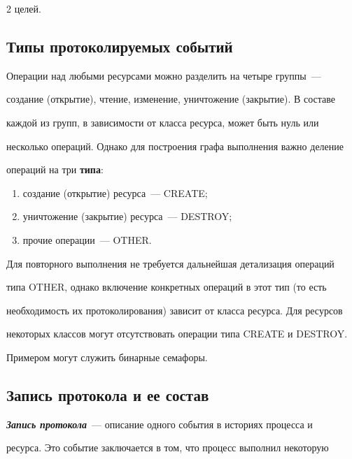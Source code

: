\begin{multicols}{2}
целей.



\subsection*{Типы протоколируемых событий}



Операции над любыми ресурсами можно разделить на четыре группы~---

создание (открытие), чтение, изменение, уничтожение (закрытие). В составе

каждой из групп, в зависимости от класса ресурса, может быть нуль или

несколько операций. Однако для по\-стро\-ения графа выполнения важно деление

операций на три \textbf{типа}:

\begin{enumerate}[(1)]

\item создание (открытие) ресурса~--- CREATE;

\item уничтожение (закрытие) ресурса~--- DESTROY;

\item прочие операции~--- OTHER.

\end{enumerate}



Для повторного выполнения не требуется дальнейшая детализация операций

типа \mbox{OTHER}, однако включение конкретных операций в этот тип (то есть

необходимость их протоколирования) зависит от класса ресурса. Для ресурсов

некоторых классов могут отсутствовать операции типа CREATE и DESTROY.

Примером могут служить бинарные семафоры.



\subsection*{Запись протокола и ее состав}



{\bfseries\textit{Запись протокола}}~--- описание одного события в историях процесса и

ресурса. Это  событие  заключается в том, что процесс выполнил некоторую


\end{multicols}
